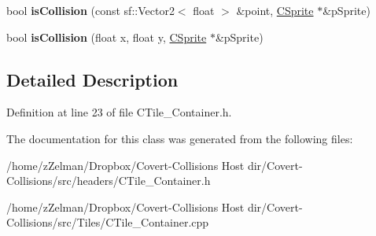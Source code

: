 \begin{DoxyCompactItemize}
\item 
\hypertarget{classCTile__Container_a4195d75fcc4790946b19ea82fc693a1c}{bool {\bfseries is\-Collision} (const sf\-::\-Vector2$<$ float $>$ \&point, \hyperlink{classCSprite}{C\-Sprite} $\ast$\&p\-Sprite)}\label{classCTile__Container_a4195d75fcc4790946b19ea82fc693a1c}

\item 
\hypertarget{classCTile__Container_a3c8b4ccbb9afaaa9462a11962b6e2dbd}{bool {\bfseries is\-Collision} (float x, float y, \hyperlink{classCSprite}{C\-Sprite} $\ast$\&p\-Sprite)}\label{classCTile__Container_a3c8b4ccbb9afaaa9462a11962b6e2dbd}

\end{DoxyCompactItemize}


\subsection{Detailed Description}


Definition at line 23 of file C\-Tile\-\_\-\-Container.\-h.



The documentation for this class was generated from the following files\-:\begin{DoxyCompactItemize}
\item 
/home/z\-Zelman/\-Dropbox/\-Covert-\/\-Collisions Host dir/\-Covert-\/\-Collisions/src/headers/C\-Tile\-\_\-\-Container.\-h\item 
/home/z\-Zelman/\-Dropbox/\-Covert-\/\-Collisions Host dir/\-Covert-\/\-Collisions/src/\-Tiles/C\-Tile\-\_\-\-Container.\-cpp\end{DoxyCompactItemize}
